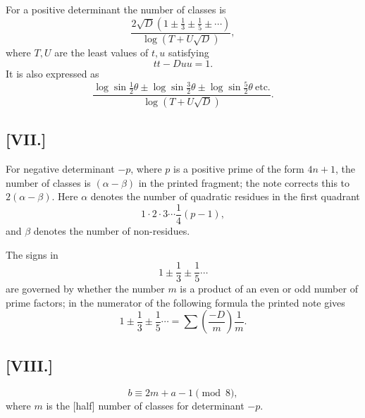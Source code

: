 \documentclass[12pt]{article}
\begin{document}
For a positive determinant the number of classes is
\[
\frac{2\sqrt D\left(1\pm\frac13\pm\frac15\pm\cdots\right)}
{\log(T+U\sqrt D)},
\]
where $T,U$ are the least values of $t,u$ satisfying
\[
tt-Duu=1.
\]
It is also expressed as
\[
\frac{\log\sin\frac12\theta\pm\log\sin\frac32\theta\pm\log\sin\frac52\theta\ \mathrm{etc.}}
{\log(T+U\sqrt D)}.
\]

\subsection*{[VII.]}

For negative determinant $-p$, where $p$ is a positive prime of the form $4n+1$, the number of classes is $(\alpha-\beta)$ in the printed fragment; the note corrects this to $2(\alpha-\beta)$. Here $\alpha$ denotes the number of quadratic residues in the first quadrant
\[
1\cdot2\cdot3\cdots\frac14(p-1),
\]
and $\beta$ denotes the number of non-residues.

The signs in
\[
1\pm\frac13\pm\frac15\cdots
\]
are governed by whether the number $m$ is a product of an even or odd number of prime factors; in the numerator of the following formula the printed note gives
\[
1\pm\frac13\pm\frac15\cdots=\sum\left(\frac{-D}{m}\right)\frac1m .
\]

\subsection*{[VIII.]}

\[
b\equiv 2m+a-1\pmod{8},
\]
where $m$ is the [half] number of classes for determinant $-p$.
\end{document}
